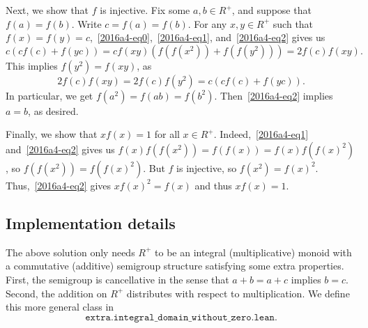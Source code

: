 \documentclass{article}
\begin{document}
Next, we show that $f$ is injective.
Fix some $a, b \in R^+$, and suppose that $f(a) = f(b)$.
Write $c = f(a) = f(b)$.
For any $x, y \in R^+$ such that $f(x) = f(y) = c$,~\eqref{2016a4-eq0},~\eqref{2016a4-eq1}, and~\eqref{2016a4-eq2} gives us
\[ c(c f(c) + f(yc)) = c f(xy) (f(f(x^2)) + f(f(y^2))) = 2 f(c) f(xy). \]
This implies $f(y^2) = f(xy)$, as
\[ 2 f(c) f(xy) = 2 f(c) f(y^2) = c(c f(c) + f(yc)). \]
In particular, we get $f(a^2) = f(ab) = f(b^2)$.
Then~\eqref{2016a4-eq2} implies $a = b$, as desired.

Finally, we show that $x f(x) = 1$ for all $x \in R^+$.
Indeed,~\eqref{2016a4-eq1} and~\eqref{2016a4-eq2} gives us $f(x) f(f(x^2)) = f(f(x)) = f(x) f(f(x)^2)$, so $f(f(x^2)) = f(f(x)^2)$.
But $f$ is injective, so $f(x^2) = f(x)^2$.
Thus,~\eqref{2016a4-eq2} gives $x f(x)^2 = f(x)$ and thus $x f(x) = 1$.



\subsection*{Implementation details}

The above solution only needs $R^+$ to be an integral (multiplicative) monoid with a commutative (additive) semigroup structure satisfying some extra properties.
First, the semigroup is cancellative in the sense that $a + b = a + c$ implies $b = c$.
Second, the addition on $R^+$ distributes with respect to multiplication.
We define this more general class in
\[ \texttt{extra.integral\_domain\_without\_zero.lean}. \]
\end{document}
